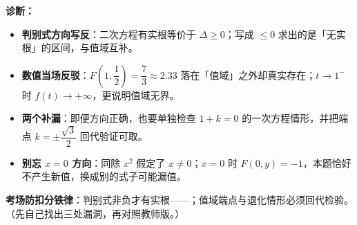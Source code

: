\begin{tcolorbox}
\begin{enumerate}[label=(\arabic*), itemsep=4pt]
\ifteacher
{\bfseries\color{main}诊断：}
\begin{itemize}[itemsep=1pt]
\item \textbf{判别式方向写反}：二次方程有实根等价于 $\Delta\ge0$；写成 $\le0$ 求出的是「无实根」的区间，与值域互补。
\item \textbf{数值当场反驳}：$F\!\left(1,\dfrac12\right)=\dfrac73\approx2.33$ 落在「值域」之外却真实存在；$t\to1^-$ 时 $f(t)\to+\infty$，更说明值域无界。
\item \textbf{两个补漏}：即便方向正确，也要单独检查 $1+k=0$ 的一次方程情形，并把端点 $k=\pm\dfrac{\sqrt3}{2}$ 回代验证可取。
\item \textbf{别忘 $x=0$ 方向}：同除 $x^2$ 假定了 $x\ne0$；$x=0$ 时 $F(0,y)=-1$，本题恰好不产生新值，换成别的式子可能漏值。
\end{itemize}

\textbf{考场防扣分铁律}：判别式非负才有实根——；值域端点与退化情形必须回代检验。
\else
{\small（先自己找出三处漏洞，再对照教师版。）}
\fi
{}
\end{enumerate}
\end{tcolorbox}


